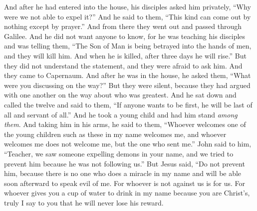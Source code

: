 \begin{biblechapter}
\verse And after he had entered into the house, his disciples asked him privately, “Why were we not able to expel it?”
\verse And he said to them, “This kind can come out by nothing except by prayer.”
 And from there they went out and passed through Galilee. And he did not want anyone to know,
\verse for he was teaching his disciples and was telling them, “The Son of Man is being betrayed into the hands of men, and they will kill him. And when he is killed, after three days he will rise.”
\verse But they did not understand the statement, and they were afraid to ask him.
 And they came to Capernaum. And after he was in the house, he asked them, “What were you discussing on the way?”
\verse But they were silent, because they had argued with one another on the way about who was greatest.
\verse And he sat down and called the twelve and said to them, “If anyone wants to be first, he will be last of all and servant of all.”
\verse And he took a young child and had him stand \textit{among them}. And taking him in his arms, he said to them,
\verse “Whoever welcomes one of the young children such as these in my name welcomes me, and whoever welcomes me does not welcome me, but the one who sent me.”
 John said to him, “Teacher, we saw someone expelling demons in your name, and we tried to prevent him because he was not following us.”
\verse But Jesus said, “Do not prevent him, because there is no one who does a miracle in my name and will be able soon afterward to speak evil of me.
\verse For whoever is not against us is for us.
\verse For whoever gives you a cup of water to drink in my name because you are Christ’s, truly I say to you that he will never lose his reward.

\end{biblechapter}
